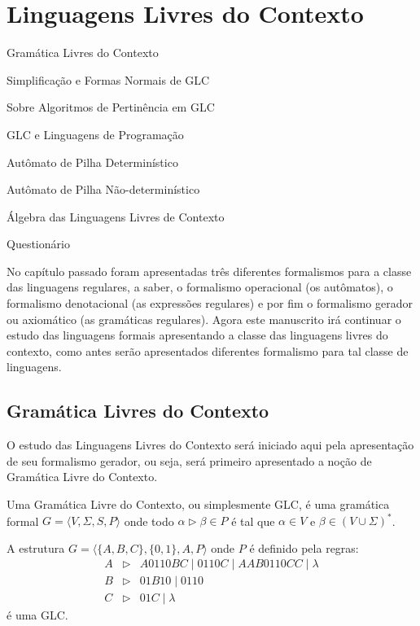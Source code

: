 
\chapter{Linguagens Livres do Contexto}\label{cap:LinguagemLLC}

\begin{introduction}[Tópicos]
	\item Gramática Livres do Contexto
	\item Simplificação e Formas Normais de GLC
	\item Sobre Algoritmos de Pertinência em GLC
	\item GLC e Linguagens de Programação
	\item Autômato de Pilha Determinístico
	\item Autômato de Pilha Não-determinístico
	\item Álgebra das Linguagens Livres de Contexto
	\item Questionário
\end{introduction}

No capítulo passado foram apresentadas três diferentes formalismos para a classe das linguagens regulares, a saber, o formalismo operacional (os autômatos), o formalismo denotacional (as expressões regulares) e por fim o formalismo gerador ou axiomático (as gramáticas regulares). Agora este manuscrito irá continuar o estudo das linguagens formais apresentando a classe das linguagens livres do contexto, como antes serão apresentados diferentes formalismo para tal classe de linguagens.

\section{Gramática Livres do Contexto}\label{sec:GLC}

O estudo das Linguagens Livres do Contexto será iniciado aqui pela apresentação de seu formalismo gerador, ou seja, será primeiro apresentado a noção de Gramática Livre do Contexto.

\begin{definition}\label{def:GLC}
	\cite{benjaLivro2010} Uma Gramática Livre do Contexto, ou simplesmente GLC, é uma gramática formal $G = \langle V, \Sigma, S, P\rangle$ onde todo $\alpha \rhd \beta \in P$ é tal que $\alpha \in V$ e $\beta \in (V \cup \Sigma)^*$.
\end{definition}

\begin{example}\label{exe:GLC-1}
	A estrutura $G = \langle \{A, B, C\}, \{0,1\}, A, P\rangle$ onde $P$ é definido pela regras:
	\begin{eqnarray*}
		A & \rhd & A0110BC \mid 0110C \mid AAB0110CC \mid \lambda\\
		B & \rhd & 01B10 \mid 0110\\
		C & \rhd & 01C \mid \lambda
	\end{eqnarray*}
	é uma GLC.
\end{example}

